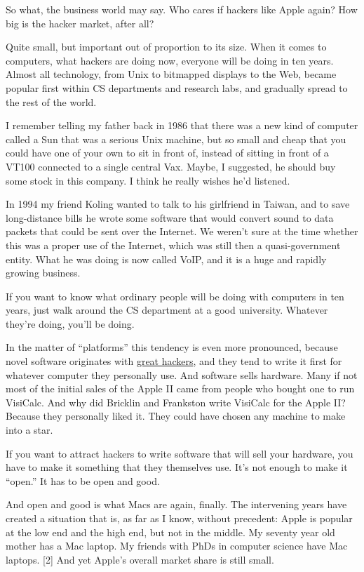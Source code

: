 So what, the business world may say. Who cares if hackers like Apple
again? How big is the hacker market, after all?

Quite small, but important out of proportion to its size. When it comes
to computers, what hackers are doing now, everyone will be doing in ten
years. Almost all technology, from Unix to bitmapped displays to the
Web, became popular first within CS departments and research labs, and
gradually spread to the rest of the world.

I remember telling my father back in 1986 that there was a new kind of
computer called a Sun that was a serious Unix machine, but so small and
cheap that you could have one of your own to sit in front of, instead of
sitting in front of a VT100 connected to a single central Vax. Maybe, I
suggested, he should buy some stock in this company. I think he really
wishes he'd listened.

In 1994 my friend Koling wanted to talk to his girlfriend in Taiwan, and
to save long-distance bills he wrote some software that would convert
sound to data packets that could be sent over the Internet. We weren't
sure at the time whether this was a proper use of the Internet, which
was still then a quasi-government entity. What he was doing is now
called VoIP, and it is a huge and rapidly growing business.

If you want to know what ordinary people will be doing with computers in
ten years, just walk around the CS department at a good university.
Whatever they're doing, you'll be doing.

In the matter of ``platforms'' this tendency is even more pronounced,
because novel software originates with \href{gh.html}{great hackers},
and they tend to write it first for whatever computer they personally
use. And software sells hardware. Many if not most of the initial sales
of the Apple II came from people who bought one to run VisiCalc. And why
did Bricklin and Frankston write VisiCalc for the Apple II? Because they
personally liked it. They could have chosen any machine to make into a
star.

If you want to attract hackers to write software that will sell your
hardware, you have to make it something that they themselves use. It's
not enough to make it ``open.'' It has to be open and good.

And open and good is what Macs are again, finally. The intervening years
have created a situation that is, as far as I know, without precedent:
Apple is popular at the low end and the high end, but not in the middle.
My seventy year old mother has a Mac laptop. My friends with PhDs in
computer science have Mac laptops. {[}2{]} And yet Apple's overall
market share is still small.

